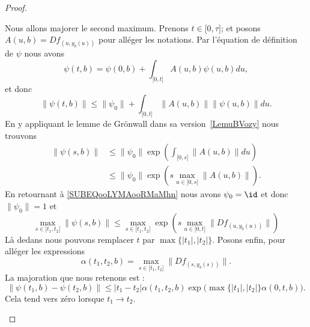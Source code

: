\begin{proof}
\begin{subproof}
\begin{subproof}
			Nous allons majorer le second maximum. Prenons \( t\in\mathopen[ 0 , \tau \mathclose]\); et posons \( A(u,b)=Df_{(u,y_b(u))}\) pour alléger les notations. Par l'équation de définition de \( \psi\) nous avons
			\begin{equation}
				\psi(t,b)=\psi(0,b)+\int_{\mathopen[ 0 , t \mathclose]}A(u,b)\psi(u,b)du,
			\end{equation}
			et donc
			\begin{equation}
				\| \psi(t,b) \|\leq \| \psi_0 \|+\int_{\mathopen[ 0 , t \mathclose]} \| A(u,b) \|  \| \psi(u,b) \|du.
			\end{equation}
			En y appliquant le lemme de Grönwall dans sa version~\ref{LemuBVozy} nous trouvons
			\begin{subequations}
				\begin{align}
					\| \psi(s,b) \| & \leq \| \psi_0 \|\exp\left( \int_{\mathopen[ 0 , s \mathclose]}\| A(u,b) \|du \right)     \\
					                & \leq \| \psi_0 \|\exp\left( s\max_{u\in\mathopen[ 0 , s \mathclose]}\| A(u,b) \| \right).
				\end{align}
			\end{subequations}
			En retournant à \eqref{SUBEQooLYMAooRMaMhn} nous avons \( \psi_0=\id\) et donc \( \| \psi_0 \|=1\) et
			\begin{equation}
				\max_{s\in\mathopen[ t_1 , t_2 \mathclose]}\| \psi(s,b) \|\leq \max_{s\in \mathopen[ t_1 , t_2 \mathclose]}\exp\left( s\max_{u\in \mathopen[ 0 , t \mathclose]}\| Df_{(u,y_b(u))} \| \right)
			\end{equation}
			Là dedans nous pouvons remplacer \( t\) par \( \max\{ | t_1 |,| t_2 | \}\). Posons enfin, pour alléger les expressions
			\begin{equation}
				\alpha(t_1,t_2,b)=\max_{s\in\mathopen[ t_1 , t_2 \mathclose]}\| Df_{(s,y_b(s))} \|.
			\end{equation}
			La majoration que nous retenons est :
			\begin{equation}
				\| \psi(t_1,b)-\psi(t_2,b) \|\leq | t_1-t_2 |\alpha(t_1,t_2,b)\exp\big( \max\{ | t_1 |,| t_2 | \}\alpha(0,t,b) \big).
			\end{equation}
			Cela tend vers zéro lorsque \( t_1\to t_2\).



\end{subproof}
\end{subproof}
\end{proof}
